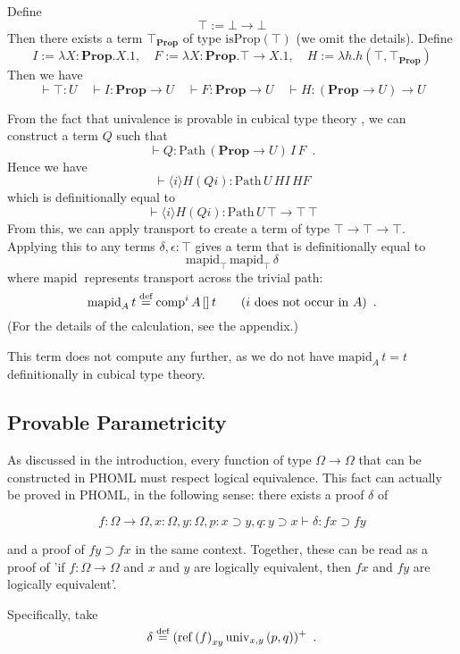 \documentclass[a4paper,UKenglish]{lipics-v2016}
\newcommand*{\eqdef}{\mathrel{\smash{\stackrel{\text{def}}{=}}}}
\newcommand*{\reff}[1]{\ensuremath{\mathrm{ref} \left( {#1} \right)}}
\newcommand*{\univ}[4]{\ensuremath{\mathrm{univ}_{{#1}, {#2}} \left({#3} , {#4} \right)}}
\newcommand{\Path}[3]{\ensuremath{\mathrm{Path} \, {#1} \, {#2} \, {#3}}}
\newcommand{\Prop}{\mathbf{Prop}}
\newcommand{\isProp}[1]{\mathrm{isProp} \left( {#1} \right)}
\newcommand{\mapid}[2]{\mathrm{mapid}_{#1} \, {#2}}
\newcommand{\comp}{\mathrm{comp}}
\theoremstyle{plain}
\theoremstyle{definition}
\begin{document}
Define
\[ \top := \bot \rightarrow \bot \]
Then there exists a term $\top_\Prop$ of type $\isProp{\top}$ (we omit the details).  Define
\[ I := \lambda X:\Prop.X.1, \quad F := \lambda X : \Prop.\top \rightarrow X.1, \quad H := \lambda h.h (\top , \top_\Prop) \]
Then we have
\[ \vdash \top : U \quad
\vdash I  : \Prop \rightarrow U \quad
\vdash F  : \Prop \rightarrow U \quad
\vdash H  : (\Prop \rightarrow U) \rightarrow U \]

From the fact that univalence is provable in cubical type theory \cite{cchm:cubical}, we can construct a term $Q$ such that
\[ \vdash Q : \Path{(\Prop \rightarrow U)}{I}{F} \enspace . \]
Hence we have
\[ \vdash \langle i \rangle H (Q i) : \Path{U}{HI}{HF} \]
which is definitionally equal to
\[ \vdash \langle i \rangle H (Q i) : \Path{U}{\top \rightarrow \top}{\top} \]
From this, we can apply transport to create a term of type $\top \rightarrow \top \rightarrow \top$.  Applying this to any terms $\delta, \epsilon : \top$ gives a term that
is definitionally equal to
\[ \mapid{\top}{\mapid{\top}{\delta}} \]
where $\mapid{}{}$ represents transport across the trivial path:
\[ \mapid{A}{t} \eqdef \comp^i \, A \, [] \, t \qquad (i \text{ does not occur in } A) \enspace . \]
(For the details of the calculation, see the appendix.)

This term does not compute any further, as we do not have $\mapid{A}{t} = t$ definitionally in cubical type theory.

\subsection{Provable Parametricity}
\label{section:exampletwo}

As discussed in the introduction, every function of type $\Omega \rightarrow \Omega$ that can be constructed in PHOML must respect logical equivalence.  This fact can actually be proved in PHOML,
in the following sense: there exists a proof $\delta$ of

\[ f : \Omega \rightarrow \Omega, x : \Omega, y : \Omega, p : x \supset y, q : y \supset x \vdash \delta : f x \supset f y \]

and a proof of $f y \supset f x$ in the same context.  Together, these can be read as a proof of 'if $f : \Omega \rightarrow \Omega$ and $x$ and $y$ are logically equivalent, then $fx$ and $fy$ are logically equivalent'.

Specifically, take
\[ \delta \eqdef (\reff{f}_{xy} \univ{x}{y}{p}{q})^+ \enspace . \]
\end{document}
